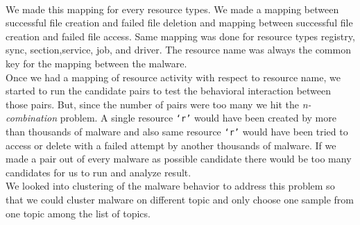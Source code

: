 \\
We made this mapping for every resource types. We made a mapping between successful file creation and failed file deletion and mapping between successful file creation and failed file access.
Same mapping was done for resource types registry, sync, section,service, job, and driver. The resource name was always the common key for the mapping between the malware.\\
Once we had a mapping of resource activity with respect to resource name, we started to run the candidate pairs to test the behavioral interaction between those pairs. But, since the number of pairs were too many we hit the \emph{n-combination} problem.
A single resource \texttt{`r'} would have been created by more than thousands of malware and also same resource \texttt{`r'} would have been tried to access or delete with a failed attempt by another thousands of malware. If we made a pair out of every malware as possible candidate there would be too many candidates for us to run and analyze result.\\
We looked into clustering of the malware behavior to address this problem so that we could cluster malware on different topic and only choose one sample from one topic among the list of topics.
